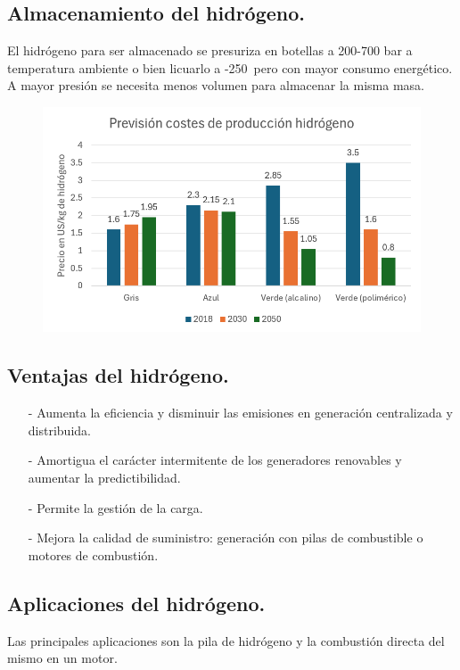 \subsection{Almacenamiento del hidrógeno.}
El hidrógeno para ser almacenado se presuriza en botellas a 200-700 bar a temperatura ambiente o bien licuarlo a -250\grado \ pero con mayor consumo energético. A mayor presión se necesita menos volumen para almacenar la misma masa.
\begin{figure}[H]
	\centering
	\includegraphics[width=0.7\linewidth]{res/tema3/hidrogeno1}
	\label{fig:hidrogeno1}
\end{figure}

\subsection{Ventajas del hidrógeno.}
\begin{itemize}
	\item [-]Aumenta la eficiencia y disminuir las emisiones en generación centralizada y
	distribuida.
	\item [-]Amortigua el carácter intermitente de los generadores renovables y aumentar la
	predictibilidad.
	\item [-]Permite la gestión de la carga.
	\item [-]Mejora la calidad de suministro: generación con pilas de combustible o motores de
	combustión.
\end{itemize}
\subsection{Aplicaciones del hidrógeno.}
Las principales aplicaciones son la pila de hidrógeno y la combustión directa del mismo en un motor.

